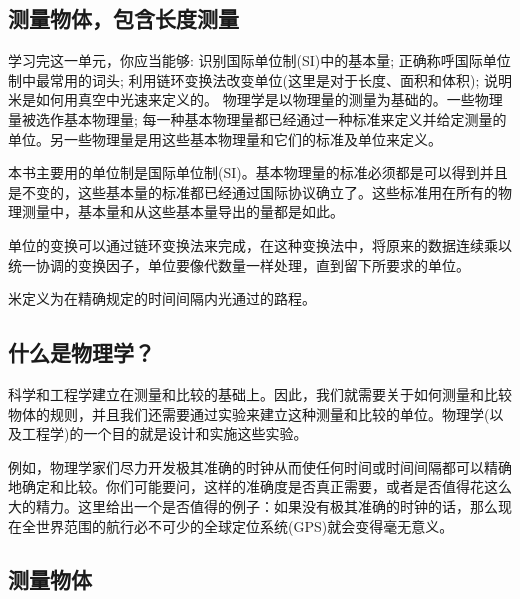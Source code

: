 \begin{Quiz}

\section{测量物体，包含长度测量}

\begin{Point*}
	学习完这一单元，你应当能够: 识别国际单位制(SI)中的基本量; 正确称呼国际单位制中最常用的词头; 利用链环变换法改变单位(这里是对于长度、面积和体积); 说明米是如何用真空中光速来定义的。
	\tcblower
	物理学是以物理量的测量为基础的。一些物理量被选作基本物理量; 每一种基本物理量都已经通过一种标准来定义并给定测量的单位。另一些物理量是用这些基本物理量和它们的标准及单位来定义。
	
	本书主要用的单位制是国际单位制(SI)。基本物理量的标准必须都是可以得到并且是不变的，这些基本量的标准都已经通过国际协议确立了。这些标准用在所有的物理测量中，基本量和从这些基本量导出的量都是如此。
	
	单位的变换可以通过链环变换法来完成，在这种变换法中，将原来的数据连续乘以统一协调的变换因子，单位要像代数量一样处理，直到留下所要求的单位。

	米定义为在精确规定的时间间隔内光通过的路程。
\end{Point*}


%



\begin{Paracol}
	\subsection{什么是物理学？}
	
	科学和工程学建立在测量和比较的基础上。因此，我们就需要关于如何测量和比较物体的规则，并且我们还需要通过实验来建立这种测量和比较的单位。物理学(以及工程学)的一个目的就是设计和实施这些实验。
	
	例如，物理学家们尽力开发极其准确的时钟从而使任何时间或时间间隔都可以精确地确定和比较。你们可能要问，这样的准确度是否真正需要，或者是否值得花这么大的精力。这里给出一个是否值得的例子：如果没有极其准确的时钟的话，那么现在全世界范围的航行必不可少的全球定位系统(GPS)就会变得毫无意义。
	
	\subsection{测量物体}
	

\end{Paracol}
\end{Quiz}
